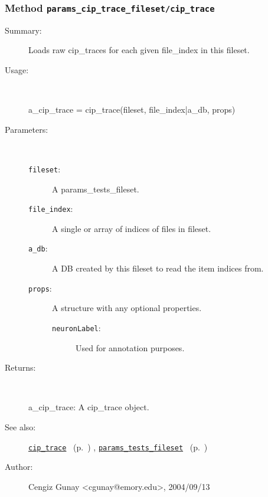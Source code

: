 \subsubsection[Method \texttt{cip\_trace}]{Method \texttt{params\_cip\_trace\_fileset/cip\_trace}}%
%
\label{ref_params_cip_trace_fileset__cip_trace}%
\hypertarget{ref_params_cip_trace_fileset__cip_trace}{}%
\begin{description}
\item[Summary:]Loads raw cip\_traces for each given file\_index in this fileset.
%
\item[Usage:]~%
\begin{lyxcode}%
a\_cip\_trace = cip\_trace(fileset, file\_index|a\_db, props)
%
\end{lyxcode}%
%
%
\item[Parameters:]~
\begin{description}%
\item[\texttt{fileset}:]
 A params\_tests\_fileset.
\item[\texttt{file\_index}:]
 A single or array of indices of files in fileset.
\item[\texttt{a\_db}:]
 A DB created by this fileset to read the item indices from.
\item[\texttt{props}:]
 A structure with any optional properties.
\begin{description}%
\item[\texttt{neuronLabel}:]
 Used for annotation purposes.
\end{description}%
\end{description}%
%
\item[Returns:
]~

	a\_cip\_trace: A cip\_trace object.
%
%
\item[See also:]%
\hyperlink{ref_cip_trace}{\texttt{cip\_trace}}%
\ (p.~\pageref{ref_cip_trace})%
%
, \hyperlink{ref_params_tests_fileset}{\texttt{params\_tests\_fileset}}%
\ (p.~\pageref{ref_params_tests_fileset})%
%
%
\item[Author:]%
Cengiz Gunay <cgunay@emory.edu>, 2004/09/13
%
\end{description}
\methodline%
